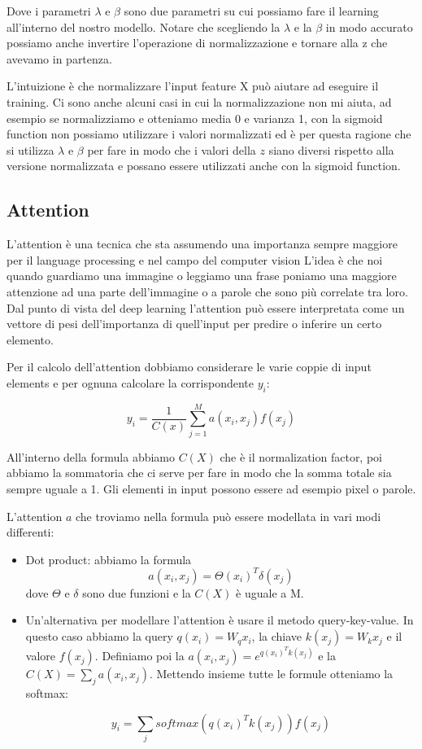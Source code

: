 \documentclass[14pt]{extreport}
\begin{document}
Dove i parametri $\lambda$ e $\beta$ sono due parametri su cui possiamo fare il learning all'interno del nostro modello. Notare che scegliendo la
$\lambda$ e la $\beta$ in modo accurato possiamo anche invertire l'operazione di normalizzazione e tornare alla z che avevamo in partenza.

L'intuizione è che normalizzare l'input feature X può aiutare ad eseguire il training. Ci sono anche alcuni casi in cui la normalizzazione non mi
aiuta, ad esempio se normalizziamo e otteniamo media 0 e varianza 1, con la sigmoid function non possiamo utilizzare i valori normalizzati ed è per
questa ragione che si utilizza $\lambda$ e $\beta$ per fare in modo che i valori della $z$ siano diversi rispetto alla versione normalizzata e possano
essere utilizzati anche con la sigmoid function.

\subsection{Attention}

L'attention è una tecnica che sta assumendo una importanza sempre maggiore per il language processing e nel campo del computer vision L'idea è che noi
quando guardiamo una immagine o leggiamo una frase poniamo una maggiore attenzione ad una parte dell'immagine o a parole che sono più correlate tra
loro. Dal punto di vista del deep learning l'attention può essere interpretata come un vettore di pesi dell'importanza di quell'input per predire o
inferire un certo elemento.

Per il calcolo dell'attention dobbiamo considerare le varie coppie di input elements e per ognuna calcolare la corrispondente $y_i$:

$$y_i = \frac{1}{C(x)}\sum_{j=1}^M a(x_i,x_j)f(x_j)$$

All'interno della formula abbiamo $C(X)$ che è il normalization factor, poi abbiamo la sommatoria che ci serve per fare in modo che la somma totale
sia sempre uguale a 1. Gli elementi in input possono essere ad esempio pixel o parole.

L'attention $a$ che troviamo nella formula può essere modellata in vari modi differenti:
\begin{itemize}
	\item Dot product: abbiamo la formula $$a(x_i, x_j) = \Theta(x_i)^T\delta(x_j)$$ dove $\Theta$ e $\delta$ sono due funzioni e la $C(X)$ è uguale a
	M.
	\item Un'alternativa per modellare l'attention è usare il metodo query-key-value. In questo caso abbiamo la query $q(x_i) = W_qx_i$, la chiave
	      $k(x_j)=W_kx_j$ e il valore $f(x_j)$. Definiamo poi la $a(x_i,x_j) = e^{q(x_i)^Tk(x_j)}$ e la $C(X)=\sum_ja(x_i, x_j)$. Mettendo insieme
	      tutte le formule otteniamo la softmax:

	      $$y_i = \sum_j softmax(q(x_i)^Tk(x_j))f(x_j)$$
\end{itemize}
\end{document}
